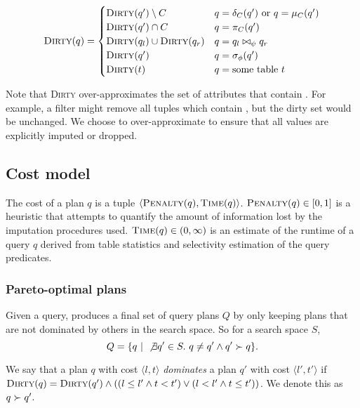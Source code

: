 \begin{align*}
  \textsc{Dirty}(q) = \begin{cases}
    \textsc{Dirty}(q') \setminus C & q = \delta_C(q')\ \text{or}\ q = \mu_C(q') \\
    \textsc{Dirty}(q') \cap C & q = \pi_C(q') \\
    \textsc{Dirty}(q_l) \cup \textsc{Dirty}(q_r) & q = q_l \bowtie_\psi q_r \\
    \textsc{Dirty}(q') & q = \sigma_\phi(q') \\
    \textsc{Dirty}(t) & q = \text{some table}\ t \\
  \end{cases}
\end{align*}

Note that \textsc{Dirty} over-approximates the set of attributes that contain \nullv{}. For example, a filter might remove all tuples which contain \nullv{}, but the dirty set would be unchanged. We choose to over-approximate to ensure that all \nullv{} values are explicitly imputed or dropped.


\subsection{Cost model}
\label{sec:cost-model}
The cost of a plan $q$ is a tuple $\langle \textsc{Penalty}(q), \textsc{Time}(q) \rangle$.
$\textsc{Penalty}(q) \in [0,1]$ is a heuristic that attempts to quantify the amount of information lost by the imputation procedures used.
$\textsc{Time}(q) \in (0, \infty)$ is an estimate of the runtime of a query $q$ derived from table statistics and selectivity estimation of the query predicates. 

\subsubsection{Pareto-optimal plans}
Given a query, \ProjectName{} produces a final set of query plans $Q$ by only keeping plans that are not dominated by others in the search space. So for a search space $S$, \[Q= \{ q ~|~ \not\exists q' \in S.\ q \neq q' \land q' \succ q \}.\]

\begin{definition}
We say that a plan $q$ with cost $\langle l, t \rangle$ \emph{dominates} a plan $q'$ with cost $\langle l', t' \rangle$ if $\textsc{Dirty}(q) = \textsc{Dirty}(q') \land ((l \leq l' \land t < t') \lor (l < l' \land t \leq t'))$. We denote this as $q \succ q'$. 
\end{definition}


